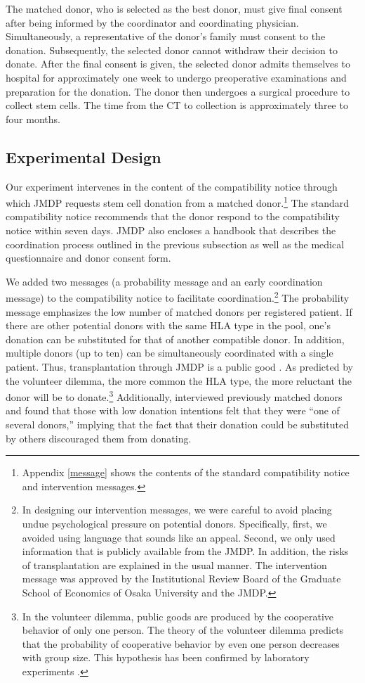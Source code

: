 \documentclass[12pt, a4paper]{article}
\begin{document}
The matched donor, who is selected as the best donor, must give final consent after being informed by the coordinator and coordinating physician. Simultaneously, a representative of the donor's family must consent to the donation. Subsequently, the selected donor cannot withdraw their decision to donate. After the final consent is given, the selected donor admits themselves to hospital for approximately one week to undergo preoperative examinations and preparation for the donation. The donor then undergoes a surgical procedure to collect stem cells. The time from the CT to collection is approximately three to four months.

\hypertarget{design}{%
\subsection{Experimental Design}\label{design}}

Our experiment intervenes in the content of the compatibility notice through which JMDP requests stem cell donation from a matched donor.\footnote{Appendix \ref{message} shows the contents of the standard compatibility notice and intervention messages.} The standard compatibility notice recommends that the donor respond to the compatibility notice within seven days. JMDP also encloses a handbook that describes the coordination process outlined in the previous subsection as well as the medical questionnaire and donor consent form.

We added two messages (a probability message and an early coordination message) to the compatibility notice to facilitate coordination.\footnote{In designing our intervention messages, we were careful to avoid placing undue psychological pressure on potential donors. Specifically, first, we avoided using language that sounds like an appeal. Second, we only used information that is publicly available from the JMDP. In addition, the risks of transplantation are explained in the usual manner. The intervention message was approved by the Institutional Review Board of the Graduate School of Economics of Osaka University and the JMDP.} The probability message emphasizes the low number of matched donors per registered patient. If there are other potential donors with the same HLA type in the pool, one's donation can be substituted for that of another compatible donor. In addition, multiple donors (up to ten) can be simultaneously coordinated with a single patient. Thus, transplantation through JMDP is a public good \citep{Bergstrom2009}. As predicted by the volunteer dilemma, the more common the HLA type, the more reluctant the donor will be to donate.\footnote{In the volunteer dilemma, public goods are produced by the cooperative behavior of only one person. The theory of the volunteer dilemma predicts that the probability of cooperative behavior by even one person decreases with group size. This hypothesis has been confirmed by laboratory experiments \citep{Diekmann1985, Diekmann1986, Franzen1999, Davis2017}.} Additionally, \citet{Kurosawa2022} interviewed previously matched donors and found that those with low donation intentions felt that they were ``one of several donors,'' implying that the fact that their donation could be substituted by others discouraged them from donating.
\end{document}
